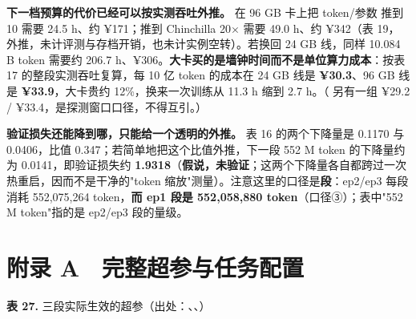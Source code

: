 \documentclass[11pt,openany]{ctexart}
\begin{document}
\textbf{下一档预算的代价已经可以按实测吞吐外推。} 在 96 GB 卡上把 token/参数 推到 10 需要 24.5 h、约 ¥171；推到 Chinchilla 20$\times$ 需要 49.0 h、约 ¥342（表 19，外推，未计评测与存档开销，也未计实例空转）。若换回 24 GB 线，同样 10.084 B token 需要约 206.7 h、¥306。\textbf{大卡买的是墙钟时间而不是单位算力成本}：按表 17 的整段实测吞吐复算，每 10 亿 token 的成本在 24 GB 线是 \textbf{¥30.3}、96 GB 线是 \textbf{¥33.9}，大卡贵约 12\allowbreak{}\%，换来一次训练从 11.3 h 缩到 2.7 h。（ 另有一组 ¥29.2 / ¥33.4，是探测窗口口径，不得互引。）

\textbf{验证损失还能降到哪，只能给一个透明的外推。} 表 16 的两个下降量是 0.1170 与 0.0406，比值 0.347；若简单地把这个比值外推，下一段 552 M token 的下降量约为 0.0141，即验证损失约 \textbf{1.9318}（\textbf{假说，未验证}；这两个下降量各自都跨过一次热重启，因而不是干净的"token 缩放"测量）。注意这里的口径是\textbf{段}：ep2/ep3 每段消耗 552,075,264 token，\textbf{而 ep1 段是 552,058,880 token}（口径③）；表中"552 M token"指的是 ep2/ep3 段的量级。

\startappendix

\section{附录 A　完整超参与任务配置}

\noindent\textbf{表 27.} 三段实际生效的超参（出处：、、）
\end{document}

